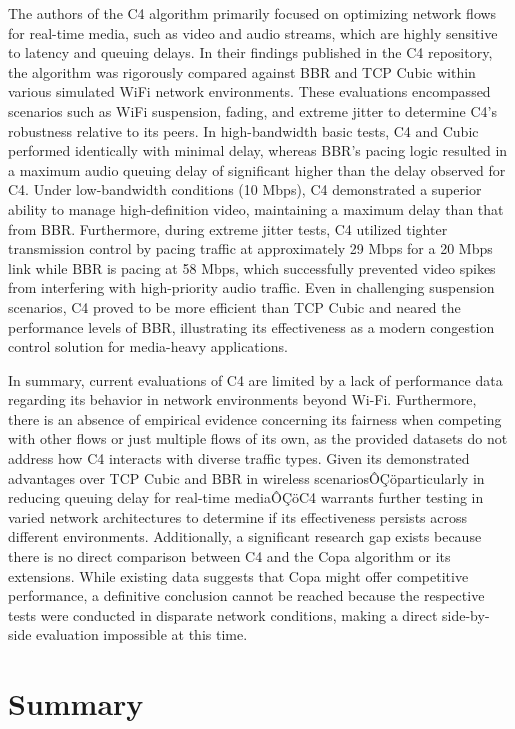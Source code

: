 \documentclass[conference]{IEEEtran}
\begin{document}
The authors of the C4 algorithm primarily focused on optimizing network flows for real-time media, such as video and audio streams, which are highly sensitive to latency and queuing delays. 
In their findings published in the C4 repository, the algorithm was rigorously compared against BBR and TCP Cubic within various simulated WiFi network environments. 
These evaluations encompassed scenarios such as WiFi suspension, fading, and extreme jitter to determine C4's robustness relative to its peers. 
In high-bandwidth basic tests, C4 and Cubic performed identically with minimal delay, whereas BBR's pacing logic resulted in a maximum audio queuing delay of significant higher than the delay observed for C4. 
Under low-bandwidth conditions (10 Mbps), C4 demonstrated a superior ability to manage high-definition video, maintaining a maximum delay than that from BBR. 
Furthermore, during extreme jitter tests, C4 utilized tighter transmission control by pacing traffic at approximately 29 Mbps for a 20 Mbps link while BBR is pacing at 58 Mbps, which successfully prevented video spikes from interfering with high-priority audio traffic. 
Even in challenging suspension scenarios, C4 proved to be more efficient than TCP Cubic and neared the performance levels of BBR, illustrating its effectiveness as a modern congestion control solution for media-heavy applications.

In summary, current evaluations of C4 are limited by a lack of performance data regarding its behavior in network environments beyond Wi-Fi. 
Furthermore, there is an absence of empirical evidence concerning its fairness when competing with other flows or just multiple flows of its own, as the provided datasets do not address how C4 interacts with diverse traffic types. 
Given its demonstrated advantages over TCP Cubic and BBR in wireless scenariosÔÇöparticularly in reducing queuing delay for real-time mediaÔÇöC4 warrants further testing in varied network architectures to determine if its effectiveness persists across different environments. 
Additionally, a significant research gap exists because there is no direct comparison between C4 and the Copa algorithm or its extensions. 
While existing data suggests that Copa might offer competitive performance, a definitive conclusion cannot be reached because the respective tests were conducted in disparate network conditions, making a direct side-by-side evaluation impossible at this time.
 

\section{Summary}\label{sec:Summary}
\end{document}
